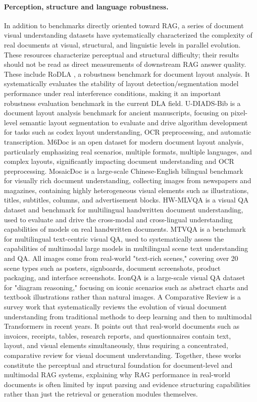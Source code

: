 \paragraph{Perception, structure and language robustness.}
In addition to benchmarks directly oriented toward RAG, a series of document visual understanding datasets have systematically characterized the complexity of real documents at visual, structural, and linguistic levels in parallel evolution. These resources characterize perceptual and structural difficulty; their results should not be read as direct measurements of downstream RAG answer quality. These include RoDLA \cite{rodla2024}, a robustness benchmark for document layout analysis. It systematically evaluates the stability of layout detection/segmentation model performance under real interference conditions, making it an important robustness evaluation benchmark in the current DLA field. U-DIADS-Bib \cite{udiadsbib2024} is a document layout analysis benchmark for ancient manuscripts, focusing on pixel-level semantic layout segmentation to evaluate and drive algorithm development for tasks such as codex layout understanding, OCR preprocessing, and automatic transcription. M6Doc \cite{m6doc2023} is an open dataset for modern document layout analysis, particularly emphasizing real scenarios, multiple formats, multiple languages, and complex layouts, significantly impacting document understanding and OCR preprocessing. MosaicDoc \cite{mosaicdoc2025} is a large-scale Chinese-English bilingual benchmark for visually rich document understanding, collecting images from newspapers and magazines, containing highly heterogeneous visual elements such as illustrations, titles, subtitles, columns, and advertisement blocks. HW-MLVQA \cite{hwmlvqa2025} is a visual QA dataset and benchmark for multilingual handwritten document understanding, used to evaluate and drive the cross-modal and cross-lingual understanding capabilities of models on real handwritten documents. MTVQA \cite{mtvqa2025} is a benchmark for multilingual text-centric visual QA, used to systematically assess the capabilities of multimodal large models in multilingual scene text understanding and QA. All images come from real-world "text-rich scenes," covering over 20 scene types such as posters, signboards, document screenshots, product packaging, and interface screenshots. IconQA \cite{iconqa2024} is a large-scale visual QA dataset for "diagram reasoning," focusing on iconic scenarios such as abstract charts and textbook illustrations rather than natural images. A Comparative Review \cite{vdureview2025} is a survey work that systematically reviews the evolution of visual document understanding from traditional methods to deep learning and then to multimodal Transformers in recent years. It points out that real-world documents such as invoices, receipts, tables, research reports, and questionnaires contain text, layout, and visual elements simultaneously, thus requiring a concentrated, comparative review for visual document understanding. Together, these works constitute the perceptual and structural foundation for document-level and multimodal RAG systems, explaining why RAG performance in real-world documents is often limited by input parsing and evidence structuring capabilities rather than just the retrieval or generation modules themselves.
